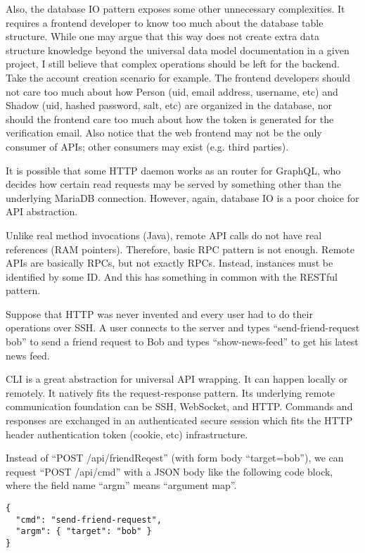 Also, the database IO pattern exposes some other unnecessary complexities.
It requires a frontend developer to know too much about the database table structure.
While one may argue that this way does not create extra data structure knowledge beyond
the universal data model documentation in a given project,
I still believe that complex operations should be left for the backend.
Take the account creation scenario for example.
The frontend developers should not care too much about how Person (uid, email address, username, etc)
and Shadow (uid, hashed password, salt, etc) are organized in the database,
nor should the frontend care too much about how the token is generated for the verification email.
Also notice that the web frontend may not be the only consumer of APIs; other consumers may exist (e.g. third parties).

It is possible that some HTTP daemon works as an router for GraphQL,
who decides how certain read requests may be served by something other than the underlying MariaDB connection.
However, again, database IO is a poor choice for API abstraction.

Unlike real method invocations (Java), remote API calls do not have real references (RAM pointers).
Therefore, basic RPC pattern is not enough.
Remote APIs are basically RPCs, but not exactly RPCs.
Instead, instances must be identified by some ID.
And this has something in common with the RESTful pattern.

Suppose that HTTP was never invented and every user had to do their operations over SSH.
A user connects to the server and types ``send-friend-request bob'' to send a friend request to Bob
and types ``show-news-feed'' to get his latest news feed.

CLI is a great abstraction for universal API wrapping.
It can happen locally or remotely.
It natively fits the request-response pattern.
Its underlying remote communication foundation can be SSH, WebSocket, and HTTP.
Commands and responses are exchanged in an authenticated secure session
which fits the HTTP header authentication token (cookie, etc) infrastructure.

Instead of ``POST /api/friendReqest'' (with form body ``target=bob''), we can request ``POST /api/cmd''
with a JSON body like the following code block,
where the field name ``argm'' means ``argument map''.

\lstset{linewidth=\linewidth}
\begin{lstlisting}
{
  "cmd": "send-friend-request",
  "argm": { "target": "bob" }
}
\end{lstlisting}

